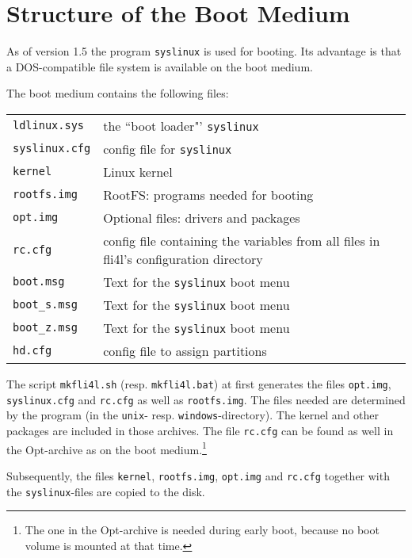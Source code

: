 \section{Structure of the Boot Medium}

As of version 1.5 the program \texttt{syslinux} is used for booting.
Its advantage is that a DOS-compatible file system is available on
the boot medium.

The boot medium contains the following files:

\begin{table}[htbp]
\centering
\begin{tabular}[h!]{lp{10cm}}
\texttt{ldlinux.sys}             & the ``boot loader"' \texttt{syslinux} \\
\texttt{syslinux.cfg}            & config file for \texttt{syslinux} \\
\texttt{kernel}                  & Linux kernel\\
\texttt{rootfs.img}              & RootFS: programs needed for booting\\
\texttt{opt.img}                 & Optional files: drivers and packages\\
\texttt{rc.cfg}                  & config file containing the variables from all
files in fli4l's configuration directory\\
\texttt{boot.msg}                & Text for the \texttt{syslinux} boot menu \\
\texttt{boot\_s.msg}             & Text for the \texttt{syslinux} boot menu \\
\texttt{boot\_z.msg}             & Text for the \texttt{syslinux} boot menu \\
\texttt{hd.cfg}                  & config file to assign partitions \\
\end{tabular}
\end{table}

The script \texttt{mkfli4l.sh} (resp. \texttt{mkfli4l.bat}) at first generates the
files \texttt{opt.img}, \texttt{syslinux.cfg} and \texttt{rc.cfg} as well as \texttt{rootfs.img}.
The files needed are determined by the program  (in the \texttt{unix}- resp.
\texttt{windows}-directory). The kernel and other packages are included in those archives.
The file \texttt{rc.cfg} can be found as well in the Opt-archive as on the
boot medium.\footnote{The one in the Opt-archive is needed during early boot,
because no boot volume is mounted at that time.}

Subsequently, the files \texttt{kernel}, \texttt{rootfs.img}, \texttt{opt.img}
and \texttt{rc.cfg} together with the \texttt{syslinux}-files are copied to the disk.

